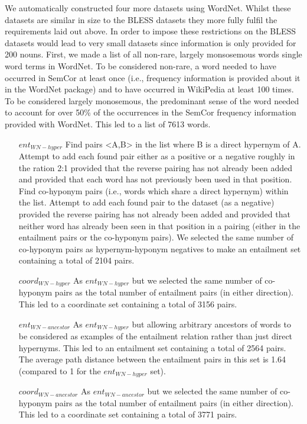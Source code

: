 \documentclass[11pt]{article}
\begin{document}
We automatically constructed four more datasets using WordNet.  Whilst these datasets are similar in size to the BLESS datasets they more fully fulfil the requirements laid out above.  In order to impose these restrictions on the BLESS datasets would lead to very small datasets since information is only provided for 200 nouns.  First, we made a list of all non-rare, largely monsosemous words single word terms in WordNet.  To be considered non-rare, a word needed to have occurred in SemCor at least once (i.e., frequency information is provided about it in the WordNet package) and to have occurred in WikiPedia at least 100 times.  To be considered largely monosemous, the predominant sense of the word needed to account for over 50\% of the occurrences in the SemCor frequency information provided with WordNet.  This led to a list of 7613 words.

\begin{itemize}
\item[$ent_{WN-hyper}$]{Find pairs <A,B> in the list where B is a direct hypernym of A.  Attempt to add each found pair either as a positive or a negative roughly in the ration 2:1 provided that the reverse pairing has not already been added and provided that each word has not previously been used in that position.  Find co-hyponym pairs (i.e., words which share a direct hypernym) within the list.  Attempt to add each found pair to the dataset (as a negative) provided the reverse pairing has not already been added and provided that neither word has already been seen in that position in a pairing (either in the entailment pairs or the co-hyponym pairs).  We selected the same number of co-hyponym pairs as hypernym-hyponym negatives to make an entailment set containing a total of 2104 pairs.}
\item[$coord_{WN-hyper}$]{As $ent_{WN-hyper}$ but we selected the same number of co-hyponym pairs as the total number of entailment pairs (in either direction).  This led to a coordinate set containing a total of 3156 pairs.}
\item[$ent_{WN-ancestor}$]{As $ent_{WN-hyper}$ but allowing arbitrary ancestors of words to be considered as examples of the entailment relation rather than just direct hypernyms.  This led to an entailment set containing a total of 2564 pairs.  The average path distance between the entailment pairs in this set is 1.64 (compared to 1 for the $ent_{WN-hyper}$ set).}
\item[$coord_{WN-ancestor}$]{As $ent_{WN-ancestor}$ but we selected the same number of co-hyponym pairs as the total number of entailment pairs (in either direction).  This led to a coordinate set containing a total of 3771 pairs.}
\end{itemize}
\end{document}
